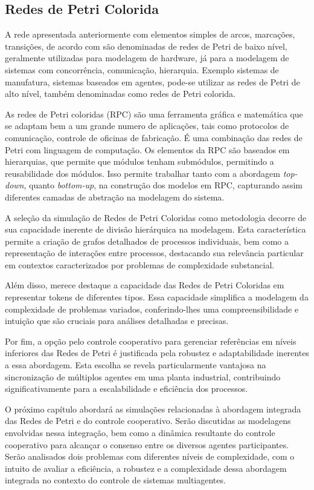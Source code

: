 \subsection{Redes de Petri Colorida}
A rede apresentada anteriormente com elementos simples de arcos, marcações, transições, de acordo com \cite{jensen} são denominadas de redes de Petri de baixo nível, geralmente utilizadas para modelagem de hardware, já para a modelagem de sistemas com concorrência, comunicação, hierarquia. Exemplo  sistemas de manufatura, sistemas baseados em agentes, pode-se utilizar as redes de Petri de alto nível, também denominadas como redes de Petri colorida. 

As redes de Petri  coloridas (\gls{RPC}) são uma ferramenta gráfica e matemática que se adaptam bem a um grande numero de aplicações, tais como protocolos de comunicação, controle de oficinas de fabricação. É uma combinação das redes de Petri com linguagem de computação. Os elementos da \gls{RPC} são baseados em hierarquias, que permite que módulos tenham submódulos, permitindo a reusabilidade dos módulos. Isso permite trabalhar tanto com a abordagem \textit{top-down}, quanto \textit{bottom-up}, na construção dos modelos em RPC, capturando assim diferentes camadas de abstração na modelagem do sistema.

A seleção da simulação de Redes de Petri Coloridas como metodologia decorre de sua capacidade inerente de divisão hierárquica na modelagem. Esta característica permite a criação de grafos detalhados de processos individuais, bem como a representação de interações entre processos, destacando sua relevância particular em contextos caracterizados por problemas de complexidade substancial.

Além disso, merece destaque a capacidade das Redes de Petri Coloridas em representar tokens de diferentes tipos. Essa capacidade simplifica a modelagem da complexidade de problemas variados, conferindo-lhes uma compreensibilidade e intuição que são cruciais para análises detalhadas e precisas.

Por fim, a opção pelo controle cooperativo para gerenciar referências em níveis inferiores das Redes de Petri é justificada pela robustez e adaptabilidade inerentes a essa abordagem. Esta escolha se revela particularmente vantajosa na sincronização de múltiplos agentes em uma planta industrial, contribuindo significativamente para a escalabilidade e eficiência dos processos.

O próximo capítulo abordará as simulações relacionadas à abordagem integrada das Redes de Petri e do controle cooperativo. Serão discutidas as modelagens envolvidas nessa integração, bem como a dinâmica resultante do controle cooperativo para alcançar o consenso entre os diversos agentes participantes. Serão analisados dois problemas com diferentes níveis de complexidade, com o intuito de avaliar a eficiência, a robustez e a complexidade dessa abordagem integrada no contexto do controle de sistemas multiagentes.
